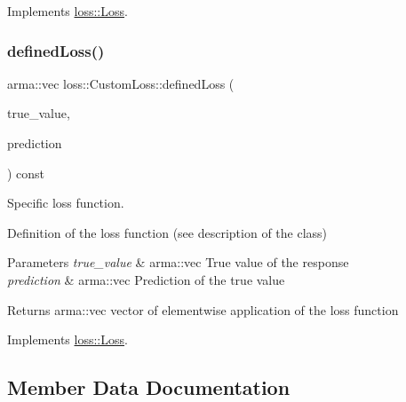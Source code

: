 Implements \mbox{\hyperlink{classloss_1_1_loss_a267a4de70747ade4b2d84ce35a448979}{loss\+::\+Loss}}.

\mbox{\label{classloss_1_1_custom_loss_a2a96bc5e4b4894bbaa64745a3f7c0fd5}} 
\subsubsection{\texorpdfstring{defined\+Loss()}{definedLoss()}}
{\footnotesize\ttfamily arma\+::vec loss\+::\+Custom\+Loss\+::defined\+Loss (\begin{DoxyParamCaption}\item[{const arma\+::vec \&}]{true\+\_\+value,  }\item[{const arma\+::vec \&}]{prediction }\end{DoxyParamCaption}) const\hspace{0.3cm}{\ttfamily [virtual]}}



Specific loss function. 

Definition of the loss function (see description of the class)


\begin{DoxyParams}{Parameters}
{\em true\+\_\+value} & {\ttfamily arma\+::vec} True value of the response \\
\hline
{\em prediction} & {\ttfamily arma\+::vec} Prediction of the true value\\
\hline
\end{DoxyParams}
\begin{DoxyReturn}{Returns}
{\ttfamily arma\+::vec} vector of elementwise application of the loss function 
\end{DoxyReturn}


Implements \mbox{\hyperlink{classloss_1_1_loss_ae9f94dd9b8311397583ba3a9cb485e94}{loss\+::\+Loss}}.



\subsection{Member Data Documentation}
\mbox{\label{classloss_1_1_custom_loss_af3f00f7f006f7466c79fff83d763c359}} 
